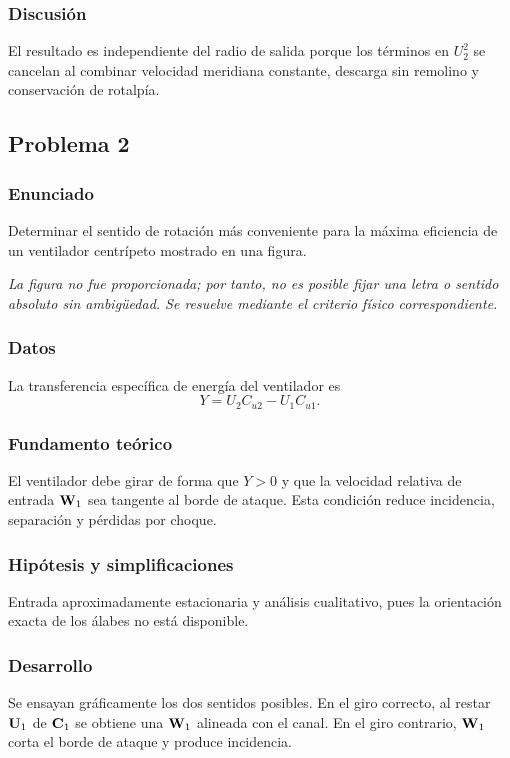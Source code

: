 \documentclass[12pt]{article}
\newcommand{\figuraFaltante}{\emph{La figura no fue proporcionada; por tanto, no es posible fijar una letra o sentido absoluto sin ambigüedad. Se resuelve mediante el criterio físico correspondiente.}}
\begin{document}
\subsubsection*{Discusión}
El resultado es independiente del radio de salida porque los términos en $U_2^2$ se cancelan
al combinar velocidad meridiana constante, descarga sin remolino y conservación de
rotalpía.

\subsection{Problema 2}

\subsubsection*{Enunciado}
Determinar el sentido de rotación más conveniente para la máxima eficiencia de un ventilador
centrípeto mostrado en una figura.

\figuraFaltante

\subsubsection*{Datos}
La transferencia específica de energía del ventilador es
\[
Y=U_2C_{u2}-U_1C_{u1}.
\]

\subsubsection*{Fundamento teórico}
El ventilador debe girar de forma que $Y>0$ y que la velocidad relativa de entrada $\vb W_1$
sea tangente al borde de ataque. Esta condición reduce incidencia, separación y pérdidas por
choque.

\subsubsection*{Hipótesis y simplificaciones}
Entrada aproximadamente estacionaria y análisis cualitativo, pues la orientación exacta de
los álabes no está disponible.

\subsubsection*{Desarrollo}
Se ensayan gráficamente los dos sentidos posibles. En el giro correcto, al restar
$\vb U_1$ de $\vb C_1$ se obtiene una $\vb W_1$ alineada con el canal. En el giro contrario,
$\vb W_1$ corta el borde de ataque y produce incidencia.
\end{document}

